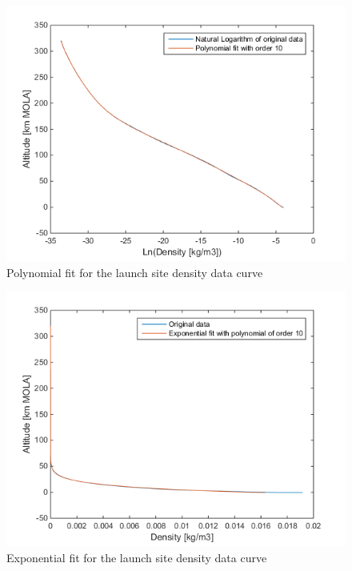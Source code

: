

\begin{figure}[!ht]
\centering
\includegraphics[width=1.0\textwidth]{figures/software/completeExpPolyFitDen.png}
\caption{Polynomial fit for the launch site density data curve}
\label{fig:completeExpPolyFitDen}
\end{figure}

\begin{figure}[!ht]
\centering
\includegraphics[width=1.0\textwidth]{figures/software/completeExpFitDen.png}
\caption{Exponential fit for the launch site density data curve}
\label{fig:completeExpFitDen}
\end{figure}


